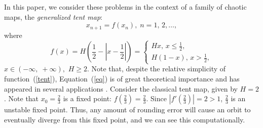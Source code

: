 \documentclass[12pt,a4paper]{amsart}
\begin{document}
In this paper, we consider these problems in the context of a family of chaotic maps, the \emph{generalized tent map}:
\begin{equation}\label{eq}
x_{n+1}=f(x_n),\;n=1,\,2,\ldots,
\end{equation}
where 
\begin{equation}\label{tent}
f(x)=H\left(\frac12-\left|x-\frac12\right|\right)=
\left\{\begin{array}{ll}
Hx,\,x\leq\frac12, \\
H(1-x),\,x>\frac12,
\end{array}\right.
\end{equation}
$x\in(-\infty, \; +\infty),$ $H\geq2.$ Note that, despite the relative simplicity of function~(\ref{tent}), 
Equation~(\ref{eq}) is of great theoretical importance and has appeared in several applications \cite{Derr, Goh}.  Consider the classical tent map, given by $H=2$. Note that $x_0=\frac23$ is a fixed point: $f(\frac23)=\frac23$.  Since $|f'(\frac23)|=2>1$, $\frac23$ is an unstable fixed point.  Thus, any amount of rounding error will cause an orbit to eventually diverge from this fixed point, and we can see this computationally. 
\end{document}

